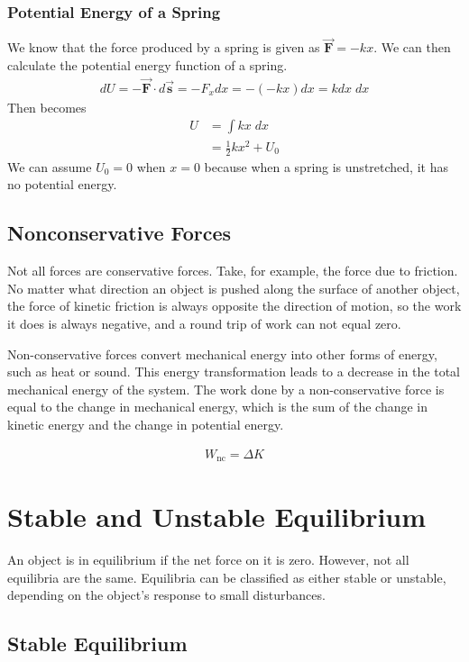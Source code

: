 \documentclass[11pt]{article}
\begin{document}
\subsubsection{Potential Energy of a Spring}
We know that the force produced by a spring is given as $\mathbf{\Vec{F}} = -kx$. We can then calculate the potential energy function of a spring. 
\begin{align*}
    dU = -\mathbf{\Vec{F}}\cdot d\mathbf{\Vec{s}} = -F_x dx = -(-kx)dx = kdx\;dx
\end{align*}
Then becomes
\begin{align*}
    U &= \int kx\;dx \\
    &= \frac{1}{2}kx^2 + U_0
\end{align*}
We can assume $U_0 = 0$ when $x = 0$ because when a spring is unstretched, it has no potential energy.  

\subsection{Nonconservative Forces}

Not all forces are conservative forces. Take, for example, the force due to friction. No matter what direction an object is pushed along the surface of another object, the force of kinetic friction is always opposite the direction of motion, so the work it does is always negative, and a round trip of work can not equal zero. 

Non-conservative forces convert mechanical energy into other forms of energy, such as heat or sound. This energy transformation leads to a decrease in the total mechanical energy of the system. The work done by a non-conservative force is equal to the change in mechanical energy, which is the sum of the change in kinetic energy and the change in potential energy.

\begin{align*}
    W_{\text{nc}} = \Delta K
\end{align*}

\section{Stable and Unstable Equilibrium}

An object is in equilibrium if the net force on it is zero. However, not all equilibria are the same. Equilibria can be classified as either stable or unstable, depending on the object's response to small disturbances.

\subsection{Stable Equilibrium}
\end{document}
